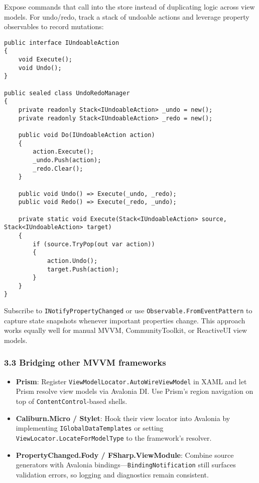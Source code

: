 Expose commands that call into the store instead of duplicating logic
across view models. For undo/redo, track a stack of undoable actions and
leverage property observables to record mutations:

\begin{lstlisting}
public interface IUndoableAction
{
    void Execute();
    void Undo();
}

public sealed class UndoRedoManager
{
    private readonly Stack<IUndoableAction> _undo = new();
    private readonly Stack<IUndoableAction> _redo = new();

    public void Do(IUndoableAction action)
    {
        action.Execute();
        _undo.Push(action);
        _redo.Clear();
    }

    public void Undo() => Execute(_undo, _redo);
    public void Redo() => Execute(_redo, _undo);

    private static void Execute(Stack<IUndoableAction> source, Stack<IUndoableAction> target)
    {
        if (source.TryPop(out var action))
        {
            action.Undo();
            target.Push(action);
        }
    }
}
\end{lstlisting}

Subscribe to \passthrough{\lstinline!INotifyPropertyChanged!} or use
\passthrough{\lstinline!Observable.FromEventPattern!} to capture state
snapshots whenever important properties change. This approach works
equally well for manual MVVM, CommunityToolkit, or ReactiveUI view
models.

\subsubsection{3.3 Bridging other MVVM
frameworks}\label{bridging-other-mvvm-frameworks}

\begin{itemize}
\tightlist
\item
  \textbf{Prism}: Register
  \passthrough{\lstinline!ViewModelLocator.AutoWireViewModel!} in XAML
  and let Prism resolve view models via Avalonia DI. Use Prism's region
  navigation on top of \passthrough{\lstinline!ContentControl!}-based
  shells.
\item
  \textbf{Caliburn.Micro / Stylet}: Hook their view locator into
  Avalonia by implementing
  \passthrough{\lstinline!IGlobalDataTemplates!} or setting
  \passthrough{\lstinline!ViewLocator.LocateForModelType!} to the
  framework's resolver.
\item
  \textbf{PropertyChanged.Fody / FSharp.ViewModule}: Combine source
  generators with Avalonia
  bindings---\passthrough{\lstinline!BindingNotification!} still
  surfaces validation errors, so logging and diagnostics remain
  consistent.
\end{itemize}

